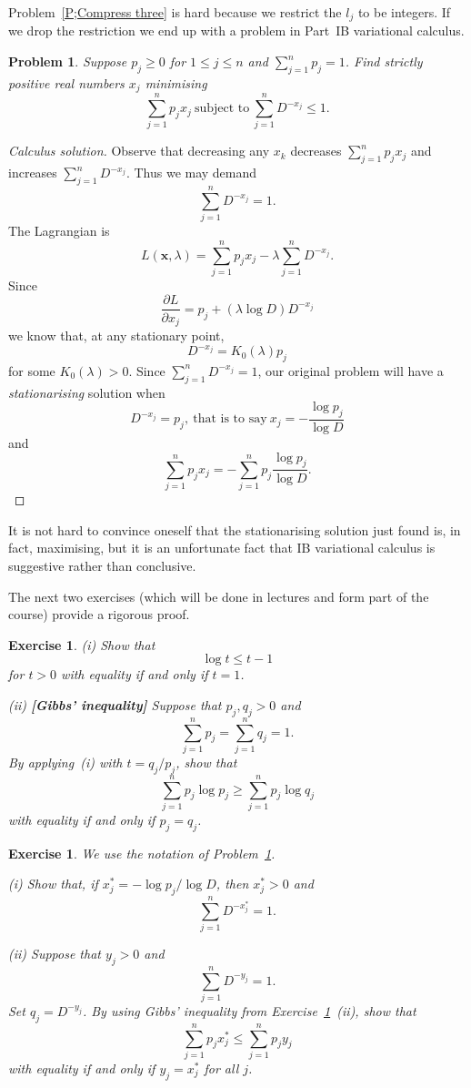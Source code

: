 \documentclass[12pt,a4paper]{article}
\theoremstyle{plain}
\newtheorem{exercise}[theorem]{Exercise}
\newtheorem{problem}[theorem]{Problem}
\theoremstyle{definition}
\begin{document}
    Problem~\ref{P;Compress three} is hard because
    we restrict the $l_{j}$ to be integers.
    If we drop the restriction we end up with a problem
    in Part~IB variational calculus.
    \begin{problem}
        \label{P;Compress variation}
        Suppose $p_{j}\geq 0$ for $1\leq j\leq n$ and $\sum_{j=1}^{n}p_{j}=1$.
        Find strictly positive real numbers $x_{j}$ minimising
        \[\sum_{j=1}^{n}p_{j}x_{j}\ \text{subject to}
        \ \sum_{j=1}^{n}D^{-x_{j}}\leq 1.\]
    \end{problem}
    \begin{proof}[Calculus solution]
        Observe
        that decreasing any $x_{k}$
        decreases $\sum_{j=1}^{n}p_{j}x_{j}$
        and increases $\sum_{j=1}^{n}D^{-x_{j}}$. Thus we may demand
        \[\sum_{j=1}^{n}D^{-x_{j}}=1.\]
        The Lagrangian is
        \[L({\mathbf x},\lambda)=\sum_{j=1}^{n}p_{j}x_{j}
        -\lambda\sum_{j=1}^{n}D^{-x_{j}}.\]
        Since
        \[\frac{\partial L}{\partial x_{j}}
        =p_{j}+(\lambda\log D)D^{-x_{j}}\]
        we know that, at any stationary point,
        \[D^{-x_{j}}=K_{0}(\lambda)p_{j}\]
        for some $K_{0}(\lambda)>0$. Since $\sum_{j=1}^{n}D^{-x_{j}}=1$,
        our original problem will have a \emph{stationarising}
        solution when
        \[D^{-x_{j}}=p_{j},\ \text{that is to say}
        \ x_{j}=-\frac{\log p_{j}}{\log D}\]
        and
        \[\sum_{j=1}^{n}p_{j}x_{j}=
        -\sum_{j=1}^{n}p_{j}\frac{\log p_{j}}{\log D}.\]
    \end{proof}
    It is not hard to convince oneself that the stationarising
    solution just found is, in fact, maximising, but it is an
    unfortunate fact that IB variational calculus is suggestive
    rather than conclusive.

    The next two exercises
    (which will be done in lectures and form part of the course)
    provide a rigorous proof.
    \begin{exercise}
        \label{E;Gibbs} (i) Show that
        \[\log t\leq t-1\]
        for $t>0$ with equality if and only if $t=1$.

        (ii) {\bf [Gibbs' inequality]}
        Suppose that $p_{j},q_{j}>0$ and
        \[\sum_{j=1}^{n}p_{j}=\sum_{j=1}^{n}q_{j}=1.\]
        By applying~(i) with $t=q_{j}/p_{j}$, show that
        \[\sum_{j=1}^{n}p_{j}\log p_{j}\geq \sum_{j=1}^{n}p_{j}\log q_{j}\]
        with equality if and only if $p_{j}=q_{j}$.
    \end{exercise}
    \begin{exercise}
        We use the notation of
        Problem~\ref{P;Compress variation}.

        (i) Show that, if $x_{j}^{*}=-\log p_{j}/\log D$, then
        $x_{j}^{*}>0$ and
        \[\sum_{j=1}^{n}D^{-x_{j}^{*}}=1.\]

        (ii) Suppose that $y_{j}>0$ and
        \[\sum_{j=1}^{n}D^{-y_{j}}=1.\]
        Set $q_{j}=D^{-y_{j}}$. By using Gibbs' inequality
        from Exercise~\ref{E;Gibbs}~(ii), show that
        \[\sum_{j=1}^{n}p_{j}x_{j}^{*}\leq \sum_{j=1}^{n}p_{j}y_{j}\]
        with equality if and only if $y_{j}=x_{j}^{*}$ for all $j$.
    \end{exercise}
\end{document}
